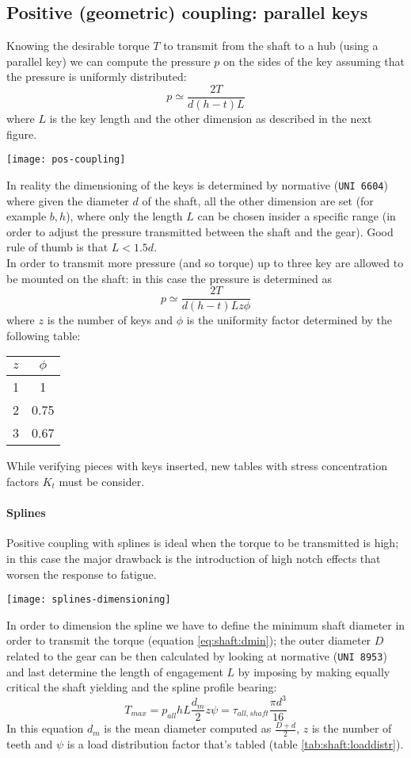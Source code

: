 \begin{multicols}
	\subsection{Positive (geometric) coupling: parallel keys}
		Knowing the desirable torque $T$ to transmit from the shaft to a hub (using a parallel key) we can compute the pressure $p$ on the sides of the key assuming that the pressure is uniformly distributed:
		\[ p \simeq \frac{2T}{d(h-t) L} \]
		where $L$ is the key length and the other dimension as described in the next figure.
		\begin{center}
			\texttt{[image: pos-coupling]}
		\end{center}
		In reality the dimensioning of the keys is determined by normative (\texttt{UNI 6604}) where given the diameter $d$ of the shaft, all the other dimension are set (for example $b,h$), where only the length $L$ can be chosen insider a specific range (in order to adjust the pressure transmitted between the shaft and the gear). Good rule of thumb is that $L < 1.5d$. \\
		In order to transmit more pressure (and so torque) up to three key are allowed to be mounted on the shaft: in this case the pressure is determined as
		\[ p \simeq \frac{2T}{d(h-t)L z \phi} \]
		where $z$ is the number of keys and $\phi$ is the uniformity factor determined by the following table:
		\begin{center}
		\begin{tabular}{c|c}
			$z$ & $\phi$ \\ \hline 
			1 & 1 \\ 2 & 0.75 \\ 3 & 0.67
		\end{tabular}
		\end{center}
		While verifying pieces with keys inserted, new tables with stress concentration factors $K_t$ must be consider.
		
		\paragraph{Splines} Positive coupling with splines is ideal when the torque to be transmitted is high; in this case the major drawback is the introduction of high notch effects that worsen the response to fatigue.
		\begin{center}
			\texttt{[image: splines-dimensioning]}
		\end{center}
		
		In order to dimension the spline we have to define the minimum shaft diameter in order to transmit the torque (equation \ref{eq:shaft:dmin}); the outer diameter $D$ related to the gear can be then calculated by looking at normative (\texttt{UNI 8953}) and last determine the length of engagement $L$ by imposing by making equally critical the shaft yielding and the spline profile bearing:
		\[ T_{max} = p_{all} h L \frac{d_m}{2} z \psi = \tau_{all,shaft} \frac{\pi d^3}{16} \]
		In this equation $d_m$ is the mean diameter computed as $\frac{D+d}{2}$, $z$ is the number of teeth and $\psi$ is a load distribution factor that's tabled (table \ref{tab:shaft:loaddistr}).
		

\end{multicols}
